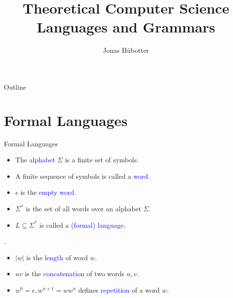 \documentclass{beamer}
\title[Theoretical Computer Science]{Theoretical Computer Science \\ Languages and Grammars}
\author{Jonas Hübotter}
\date{}
\def\b{\textcolor{blue}}
\begin{document}
\begin{frame}
  \titlepage
\end{frame}

\begin{frame}{Outline}
 \tableofcontents[subsectionstyle=hide, subsubsectionstyle=hide]
\end{frame}

\section{Formal Languages}

\begin{frame}{Formal Languages}
    \begin{definition}
        \begin{itemize}
            \item The \b{alphabet} $\Sigma$ is a finite set of symbols.\pause
            \item A finite sequence of symbols is called a \b{word}.\pause
            \item $\epsilon$ is the \b{empty word}.\pause
            \item $\Sigma^*$ is the set of all words over an alphabet $\Sigma$.\pause
            \item $L \subseteq \Sigma^*$ is called a \b{(formal) language}.
        \end{itemize}.
    \end{definition}\pause
    \begin{definition}
        \begin{itemize}
            \item $|w|$ is the \b{length} of word $w$.\pause
            \item $uv$ is the \b{concatenation} of two words $u, v$.\pause
            \item $w^0 = \epsilon, w^{n+1} = ww^n$ defines \b{repetition} of a word $w$.
        \end{itemize}
    \end{definition}
\end{frame}
\end{document}
